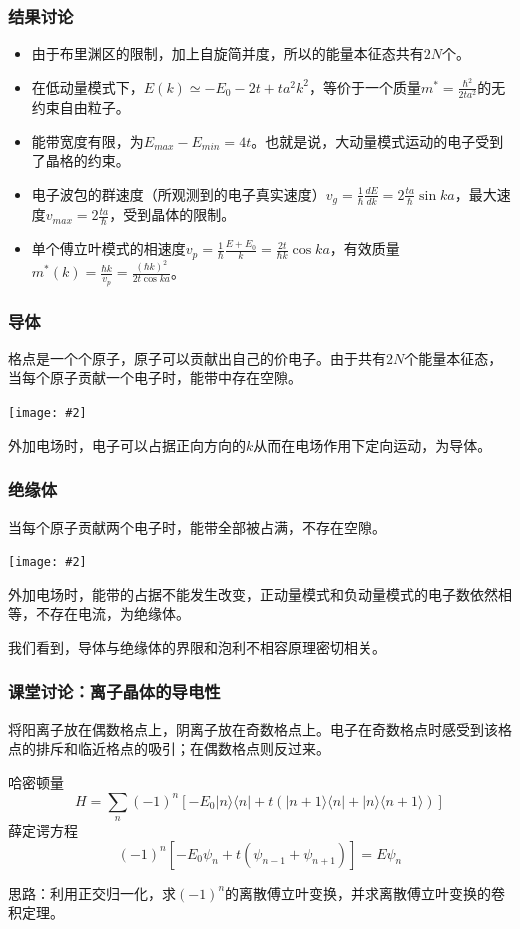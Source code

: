 \documentclass[CJK]{beamer}
\newcommand{\cpic}[2]{
\begin{center}
\texttt{[image: \#2]}
\end{center}
}
\begin{document}
\begin{frame}
\frametitle{\bch 结果讨论 \ech}
\bch
\begin{itemize}
\item 由于布里渊区的限制，加上自旋简并度，所以的能量本征态共有$2N$个。
\item 在低动量模式下，$E(k) \simeq -E_0 -2t + ta^2 k^2$，等价于一个质量$m^* = \frac{\hbar^2}{2ta^2}$的无约束自由粒子。
\item 能带宽度有限，为$E_{max} - E_{min} = 4t$。也就是说，大动量模式运动的电子受到了晶格的约束。
\item 电子波包的群速度（所观测到的电子真实速度）$v_g = \frac{1}{\hbar}\frac{dE}{dk} = 2\frac{ta}{\hbar} \sin ka$，最大速度$v_{max} = 2\frac{ta}{\hbar}$，受到晶体的限制。
\item 单个傅立叶模式的相速度$v_p = \frac{1}{\hbar}\frac{E+E_0}{k} = \frac{2t}{\hbar k} \cos ka$，有效质量$m^*(k) = \frac{\hbar k}{v_p} = \frac{(\hbar k)^2}{2t\cos ka} $。
\end{itemize}
\ech
\end{frame}

\begin{frame}
\frametitle{\bch 导体 \ech}
\bch
格点是一个个原子，原子可以贡献出自己的价电子。由于共有$2N$个能量本征态，当每个原子贡献一个电子时，能带中存在空隙。
\cpic{0.2}{half}
外加电场时，电子可以占据正向方向的$k$从而在电场作用下定向运动，为导体。
\ech
\end{frame}

\begin{frame}
\frametitle{\bch 绝缘体 \ech}
\bch
当每个原子贡献两个电子时，能带全部被占满，不存在空隙。
\cpic{0.2}{full}
外加电场时，能带的占据不能发生改变，正动量模式和负动量模式的电子数依然相等，不存在电流，为绝缘体。
\par
我们看到，导体与绝缘体的界限和泡利不相容原理密切相关。
\ech
\end{frame}

\begin{frame}
\frametitle{\bch 课堂讨论：离子晶体的导电性 \ech}
\bch
将阳离子放在偶数格点上，阴离子放在奇数格点上。电子在奇数格点时感受到该格点的排斥和临近格点的吸引；在偶数格点则反过来。
\par
哈密顿量
$$
H =  \sum_n (-1)^n \left[ -E_0 |n \rangle \langle n | + t ( |n+1 \rangle \langle n | + |n\rangle \langle n+1 \rangle )\right]
$$
薛定谔方程
$$
(-1)^n [ -E_0 \psi_n + t(\psi_{n-1} + \psi_{n+1})] = E \psi_n
$$
\par
思路：利用正交归一化，求$(-1)^n$的离散傅立叶变换，并求离散傅立叶变换的卷积定理。
\ech
\end{frame}
\end{document}
